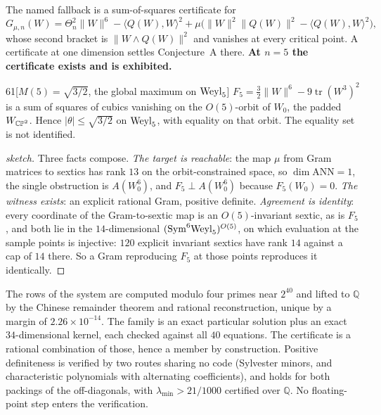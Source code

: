 The named fallback is a sum-of-squares certificate for
\[
G_{\mu,n}(W)=\Theta_n^2\|W\|^6-\langle Q(W),W\rangle^2+\mu\big(\|W\|^2\|Q(W)\|^2-\langle Q(W),W\rangle^2\big),
\]
whose second bracket is $\|W\wedge Q(W)\|^2$ and vanishes at every critical point. A certificate at one dimension settles Conjecture~A there. \textbf{At $n=5$ the certificate exists and is exhibited.}

\begin{Lem}{61}[$M(5)=\sqrt{3/2}$, the global maximum on $\mathrm{Weyl}_5$]
$F_5=\tfrac32\|W\|^6-9\operatorname{tr}(W^3)^2$ is a sum of squares of cubics vanishing on the $O(5)$-orbit of $W_0$, the padded $W_{\mathbb{CP}^2}$. Hence $\lvert\theta\rvert\le\sqrt{3/2}$ on $\mathrm{Weyl}_5$, with equality on that orbit. The equality set is not identified.
\end{Lem}

\begin{proof}[sketch]
Three facts compose. \emph{The target is reachable}: the map $\mu$ from Gram matrices to sextics has rank $13$ on the orbit-constrained space, so $\dim\mathrm{ANN}=1$, the single obstruction is $A(W_0^6)$, and $F_5\perp A(W_0^6)$ because $F_5(W_0)=0$. \emph{The witness exists}: an explicit rational Gram, positive definite. \emph{Agreement is identity}: every coordinate of the Gram-to-sextic map is an $O(5)$-invariant sextic, as is $F_5$, and both lie in the $14$-dimensional $(\mathrm{Sym}^6\mathrm{Weyl}_5)^{O(5)}$, on which evaluation at the sample points is injective: $120$ explicit invariant sextics have rank $14$ against a cap of $14$ there. So a Gram reproducing $F_5$ at those points reproduces it identically.
\end{proof}

\begin{certificate}
The rows of the system are computed modulo four primes near $2^{40}$ and lifted to $\mathbb Q$ by the Chinese remainder theorem and rational reconstruction, unique by a margin of $2.26\times10^{-14}$. The family is an exact particular solution plus an exact $34$-dimensional kernel, each checked against all $40$ equations. The certificate is a rational combination of those, hence a member by construction. Positive definiteness is verified by two routes sharing no code (Sylvester minors, and characteristic polynomials with alternating coefficients), and holds for both packings of the off-diagonals, with $\lambda_{\min}>21/1000$ certified over $\mathbb Q$. No floating-point step enters the verification.
\end{certificate}

